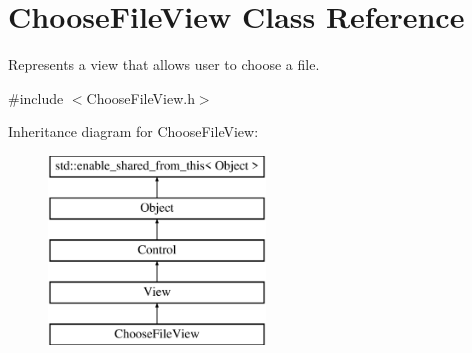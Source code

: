 \hypertarget{class_choose_file_view}{}\section{Choose\+File\+View Class Reference}
\label{class_choose_file_view}


Represents a view that allows user to choose a file.  




{\ttfamily \#include $<$Choose\+File\+View.\+h$>$}

Inheritance diagram for Choose\+File\+View\+:\begin{figure}[H]
\begin{center}
\leavevmode
\includegraphics[height=5.000000cm]{class_choose_file_view}
\end{center}
\end{figure}
